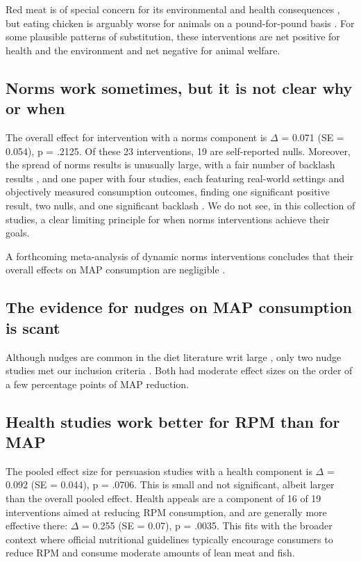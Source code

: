 \documentclass[sn-nature,pdflatex]{sn-jnl}
\begin{document}
Red meat is of special concern for its environmental and health
consequences \citep{grummon2023}, but eating chicken is arguably worse
for animals on a pound-for-pound basis \citep{mathur2022ethical}. For
some plausible patterns of substitution, these interventions are net
positive for health and the environment and net negative for animal
welfare.

\subsection{Norms work sometimes, but it is not clear why or
when}\label{sec2.5}

The overall effect for intervention with a norms component is \(\Delta\)
= 0.071 (SE = 0.054), p = .2125. Of these 23 interventions, 19 are
self-reported nulls. Moreover, the spread of norms results is unusually
large, with a fair number of backlash results
\citep{mattson2020, griesoph2021}, and one paper with four studies, each
featuring real-world settings and objectively measured consumption
outcomes, finding one significant positive result, two nulls, and one
significant backlash \citep{sparkman2020}. We do not see, in this
collection of studies, a clear limiting principle for when norms
interventions achieve their goals.

A forthcoming meta-analysis of dynamic norms interventions concludes
that their overall effects on MAP consumption are negligible
\citep{Weikertova2024}.

\subsection{The evidence for nudges on MAP consumption is
scant}\label{sec2.6}

Although nudges are common in the diet literature writ large
\citep{olafsson2024, cadario2020, szaszi2018}, only two nudge studies
met our inclusion criteria \citep{andersson2021}. Both had moderate
effect sizes on the order of a few percentage points of MAP reduction.

\subsection{Health studies work better for RPM than for
MAP}\label{sec2.7}

The pooled effect size for persuasion studies with a health component is
\(\Delta\) = 0.092 (SE = 0.044), p = .0706. This is small and not
significant, albeit larger than the overall pooled effect. Health
appeals are a component of 16 of 19 interventions aimed at reducing RPM
consumption, and are generally more effective there: \(\Delta\) = 0.255
(SE = 0.07), p = .0035. This fits with the broader context where
official nutritional guidelines typically encourage consumers to reduce
RPM and consume moderate amounts of lean meat and fish.
\end{document}
